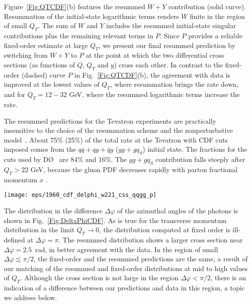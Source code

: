 \documentclass[12pt,english,aps,preprint,prd,letterpaper,fleqn,nofootinbib,showpacs,showkeys,tightenlines,floatfix]{revtex4}
\begin{document}
Figure~\ref{Fig:QTCDF}(b) features the resummed $W+Y$ contribution
(solid curve). Resummation of the initial-state logarithmic terms
renders $W$ finite in the region of small $Q_{T}$. The sum of $W$
and $Y$ includes the resummed initial-state singular contributions
plus the remaining relevant terms in $P$. Since $P$ provides a reliable
fixed-order estimate at large $Q_{T}$, we present our final resummed
prediction by switching from $W+Y$ to $P$ at the point at which the
two differential cross sections (as functions of $Q$, $Q_{T}$ and
$y$) cross each other. In contrast to the fixed-order (dashed) curve
$P$ in Fig.~\ref{Fig:QTCDF}(b), the agreement with data is improved
at the lowest values of $Q_{T}$, where resummation brings the rate
down, and for $Q_{T}=12-32$ GeV, where the resummed logarithmic terms
increase the rate.

The resummed predictions for the Tevatron experiments are practically
insensitive to the choice of the resummation scheme and the nonperturbative
model~\cite{Nadolsky:2007ba}. About 75\% (25\%) of the total rate
at the Tevatron with CDF cuts imposed comes from the $q{\bar{q}}+qg+{\bar{q}}g$
($gg+gq_{S}$) initial state. The fractions for the cuts used by D\O~ are 
84\% and 16\%. The $gg+gq_{S}$ contribution falls steeply after
$Q_{T}>22$ GeV, because the gluon PDF decreases rapidly with parton
fractional momentum $x$ \cite{Nadolsky:2007ba}.

\begin{figure*}
\texttt{[image: eps/1960\_cdf\_delphi\_w221\_css\_qqgg\_p]}


\caption{The difference $\Delta\varphi$ in the azimuthal angles of the two
photons in the laboratory frame predicted by the resummed (solid)
and fixed-order (dashed) calculations, compared to the CDF data.}

\label{Fig:DeltaPhiCDF} 
\end{figure*}


The distribution in the difference $\Delta\varphi$ of the azimuthal
angles of the photons is shown in Fig.~\ref{Fig:DeltaPhiCDF}. As
is true for the transverse momentum distribution in the limit $Q_{T}\rightarrow0$,
the distribution computed at fixed order is ill-defined at $\Delta\varphi=\pi$.
The resummed distribution shows a larger cross section near $\Delta\varphi=2.5$~rad,
in better agreement with the data. In the region of small $\Delta\varphi\lesssim\pi/2$,
the fixed-order and the resummed predictions are the same, a result
of our matching of the resummed and fixed-order distributions at mid
to high values of $Q_{T}$. Although the cross section is not large
in the region $\Delta\varphi<\pi/2$, there is an indication of a
difference between our predictions and data in this region, a topic
we address below.
\end{document}
